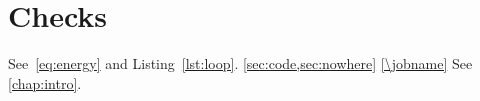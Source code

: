 \section{Checks}
\label{sec:refs}
See~\eqref{eq:energy} and Listing~\ref{lst:loop}.
\cref{sec:code,sec:nowhere}
\cite{knuth,ghost}
\newcommand{\chapref}[1]{\ref{chap:#1}\label{dup:#1}}
\ref{\jobname} \nocite{*}
See \chapref{intro}.

